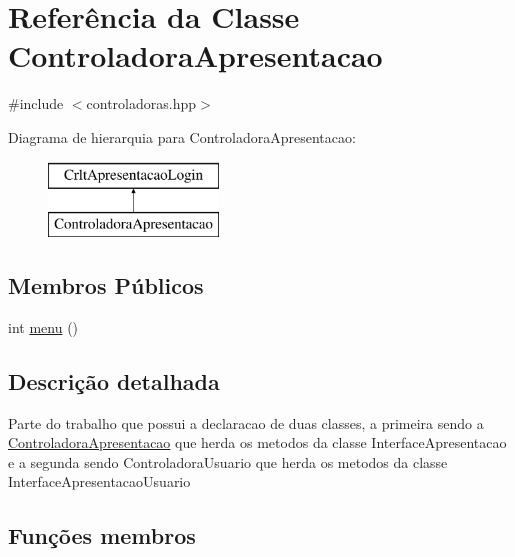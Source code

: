\hypertarget{class_controladora_apresentacao}{}\section{Referência da Classe Controladora\+Apresentacao}
\label{class_controladora_apresentacao}


{\ttfamily \#include $<$controladoras.\+hpp$>$}

Diagrama de hierarquia para Controladora\+Apresentacao\+:\begin{figure}[H]
\begin{center}
\leavevmode
\includegraphics[height=2.000000cm]{class_controladora_apresentacao}
\end{center}
\end{figure}
\subsection*{Membros Públicos}
\begin{DoxyCompactItemize}
\item 
int \mbox{\hyperlink{class_controladora_apresentacao_a303849d9fd6785bcbdd5c96fb2413ef3}{menu}} ()
\end{DoxyCompactItemize}


\subsection{Descrição detalhada}
Parte do trabalho que possui a declaracao de duas classes, a primeira sendo a \mbox{\hyperlink{class_controladora_apresentacao}{Controladora\+Apresentacao}} que herda os metodos da classe Interface\+Apresentacao e a segunda sendo Controladora\+Usuario que herda os metodos da classe Interface\+Apresentacao\+Usuario 

\subsection{Funções membros}
\mbox{\label{class_controladora_apresentacao_a303849d9fd6785bcbdd5c96fb2413ef3}} 
